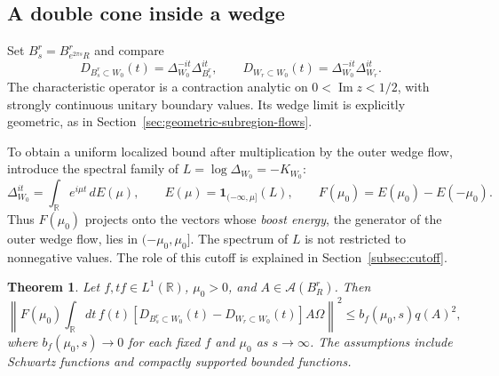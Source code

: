 \documentclass[a4paper,11pt]{article}
\newtheorem{theorem}{Theorem}
\theoremstyle{definition}
\begin{document}
\subsection{A double cone inside a wedge}\label{subsection:coneinsidewedge}

Set $B_s^r=B_{e^{2\pi s}R}^r$ and compare
\begin{equation}
 D_{B_s^r\subset W_0}(t)=\Delta_{W_0}^{-it}\Delta_{B_s^r}^{it},
 \qquad D_{W_r\subset W_0}(t)=\Delta_{W_0}^{-it}\Delta_{W_r}^{it}.
\end{equation}
The characteristic operator is a contraction analytic on $0<\operatorname{Im}z<1/2$, with strongly continuous unitary boundary values. Its wedge limit is explicitly geometric, as in Section~\ref{sec:geometric-subregion-flows}.

To obtain a uniform localized bound after multiplication by the outer wedge flow, introduce the spectral family of $L=\log\Delta_{W_0}=-K_{W_0}$:
\begin{equation}
 \Delta_{W_0}^{it}=\int_{\mathbb R}e^{i\mu t}\,dE(\mu),
 \qquad E(\mu)=\mathbf1_{(-\infty,\mu]}(L),
 \qquad F(\mu_0)=E(\mu_0)-E(-\mu_0).
 \label{eq:approx-spectral-cutoff}
\end{equation}
Thus $F(\mu_0)$ projects onto the vectors whose \emph{boost energy}, the generator of the outer wedge flow, lies in $(-\mu_0,\mu_0]$. The spectrum of $L$ is not restricted to nonnegative values. The role of this cutoff is explained in Section~\ref{subsec:cutoff}.

\begin{theorem}\label{theorem:mainresult}
Let $f,tf\in L^1(\mathbb R)$, $\mu_0>0$, and $A\in\mathcal A(B_R^r)$. Then
\begin{equation}
 \left\|F(\mu_0)\int_{\mathbb R}dt\,f(t)
 [D_{B_s^r\subset W_0}(t)-D_{W_r\subset W_0}(t)]A\Omega\right\|^2
 \leq b_f(\mu_0,s)q(A)^2,
 \label{eq:approx-characteristic-bound}
\end{equation}
where $b_f(\mu_0,s)\to0$ for each fixed $f$ and $\mu_0$ as $s\to\infty$. The assumptions include Schwartz functions and compactly supported bounded functions.
\end{theorem}
\end{document}
